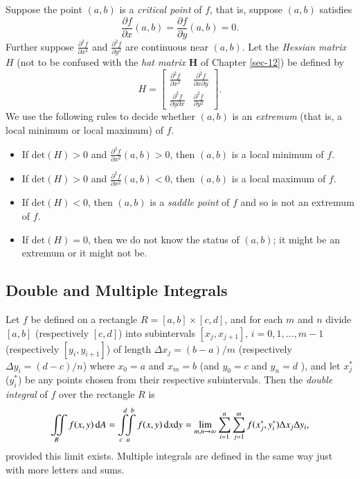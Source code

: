 \documentclass[captions=tableheading]{scrbook}
\begin{document}
\begin{example}
Suppose the point \((a,b)\) is a \emph{critical point} of \(f\), that is, suppose \((a,b)\) satisfies 
\begin{equation}
\frac{\partial f}{\partial x}(a,b)=\frac{\partial f}{\partial y}(a,b)=0.
\end{equation}
Further suppose \(\frac{\partial^{2}f}{\partial x^{2}}\) and \(\frac{\partial^{2}f}{\partial y^{2}}\) are continuous near \((a,b)\). Let the \emph{Hessian matrix} \(H\) (not to be confused with the \emph{hat matrix} \(\mathbf{H}\) of Chapter \ref{sec-12}) be defined by
\begin{equation}
H = 
\begin{bmatrix}
\frac{\partial^{2}f}{\partial x^{2}} & \frac{\partial^{2}f}{\partial x\partial y}\\
\frac{\partial^{2}f}{\partial y\partial x} & \frac{\partial^{2}f}{\partial y^{2}}
\end{bmatrix}.
\end{equation}
We use the following rules to decide whether \((a,b)\) is an \emph{extremum} (that is, a local minimum or local maximum) of \(f\).
\begin{itemize}
\item If \(\mbox{det}(H)>0\) and \(\frac{\partial^{2}f}{\partial x^{2}}(a,b)>0\), then \((a,b)\) is a local minimum of \(f\).
\item If \(\mbox{det}(H)>0\) and \(\frac{\partial^{2}f}{\partial x^{2}}(a,b)<0\), then \((a,b)\) is a local maximum of \(f\).
\item If \(\mbox{det}(H)<0\), then \((a,b)\) is a \emph{saddle point} of \(f\) and so is not an extremum of \(f\).
\item If \(\mbox{det}(H)=0\), then we do not know the status of \((a,b)\); it might be an extremum or it might not be.
\end{itemize}
\subsection{Double and Multiple Integrals}
\label{sec-21-6-3}

Let \(f\) be defined on a rectangle \(R=[a,b]\times[c,d]\), and for each \(m\) and \(n\) divide \([a,b]\) (respectively \([c,d]\)) into subintervals \([x_{j},x_{j+1}]\), \(i=0,1,\ldots,m-1\) (respectively \([y_{i},y_{i+1}]\)) of length \(\Delta x_{j}=(b-a)/m\) (respectively \(\Delta y_{i}=(d-c)/n\)) where \(x_{0}=a\) and \(x_{m}=b\) (and \(y_{0}=c\) and \(y_{n}=d\) ), and let \(x_{j}^{\ast}\) (\(y_{i}^{\ast}\)) be any points chosen from their respective subintervals. Then the \emph{double integral} of \(f\) over the rectangle \(R\) is
\begin{equation}
\iintop_{R}f(x,y)\,\mathrm{d} A=\intop_{c}^{d}\!\!\!\intop_{a}^{b}f(x,y)\,\mathrm{d} x\mathrm{d} y=\lim_{m,n\to\infty}\sum_{i=1}^{n}\sum_{j=1}^{m}f(x_{j}^{\ast},y_{i}^{\ast})\Delta x_{j}\Delta y_{i},
\end{equation}
provided this limit exists. Multiple integrals are defined in the same way just with more letters and sums.

\end{example}
\end{document}
